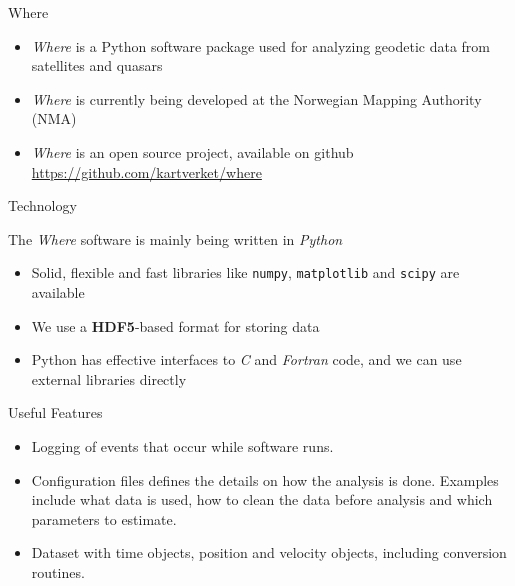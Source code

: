 \documentclass[12pt]{beamer}
\begin{document}
\begin{frame}{Where}
\begin{itemize}
\item 
  \textit{Where} is a Python software package used for analyzing geodetic data from satellites and quasars
\item
  \textit{Where} is currently being developed at the Norwegian Mapping Authority (NMA)
\item
  \textit{Where} is an open source project, available on github \url{https://github.com/kartverket/where}
\end{itemize}
\end{frame}


\begin{frame}{Technology}

The \textit{Where} software is mainly being written in \emph{Python}
\begin{itemize}
\item
  Solid, flexible and fast libraries like \texttt{numpy},
  \texttt{matplotlib} and \texttt{scipy} are available
\item
  We use a \textbf{HDF5}-based format for storing data
\item
  Python has effective interfaces to \emph{C} and \emph{Fortran}
  code, and we can use external libraries directly
\end{itemize}
\end{frame}


\begin{frame}{Useful Features}
\begin{itemize}
\item
  Logging of events that occur while software runs. 
\item 
  Configuration files defines the details on how the analysis is done. Examples include what data is used, how to clean the data before analysis and which parameters to estimate.
\item 
  Dataset with time objects, position and velocity objects, including conversion routines. 
\end{itemize}
\end{frame}
 
\end{document}
